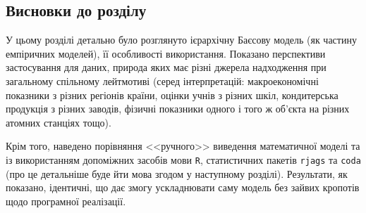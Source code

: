 \newpage
\subsection*{Висновки до розділу}

У цьому розділі детально було розглянуто ієрархічну Баєсову модель (як частину емпіричних моделей), її особливості використання. Показано перспективи застосування для даних, природа яких має різні джерела надходження при загальному спільному лейтмотиві (серед інтерпретацій: макроекономічні показники з різних регіонів країни, оцінки учнів з різних шкіл, кондитерська продукція з різних заводів, фізичні показники одного і того ж об'єкта на різних атомних станціях тощо). 

Крім того, наведено порівняння <<ручного>> виведення математичної моделі та із використанням допоміжних засобів мови \texttt{R}, статистичних пакетів \texttt{rjags} та \texttt{coda} (про це детальніше буде йти мова згодом у наступному розділі). Результати, як показано, ідентичні, що дає змогу ускладнювати саму модель без зайвих кропотів щодо програмної реалізації.